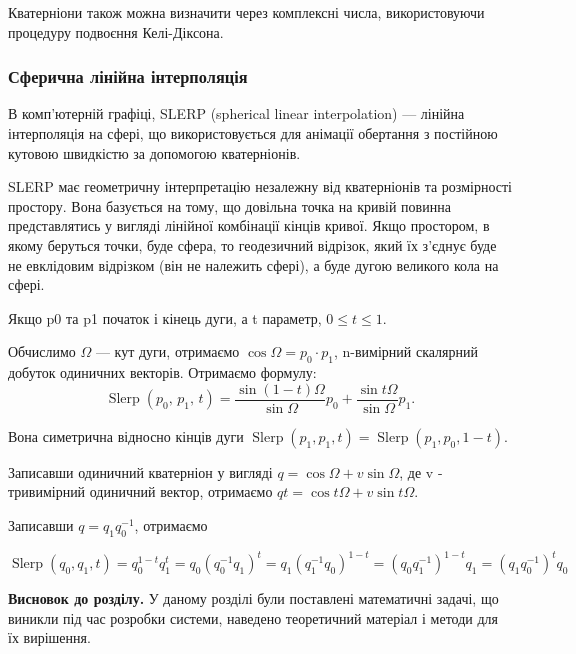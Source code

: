 Кватерніони також можна визначити через комплексні числа, використовуючи процедуру подвоєння Келі-Діксона.

\subsubsection{Сферична лінійна інтерполяція}

В комп'ютерній графіці, SLERP (spherical linear interpolation) — лінійна інтерполяція на сфері, що використовується для анімації обертання з постійною кутовою швидкістю за допомогою кватерніонів.

SLERP має геометричну інтерпретацію незалежну від кватерніонів та розмірності простору. Вона базується на тому, що довільна точка на кривій повинна представлятись у вигляді лінійної комбінації кінців кривої. Якщо простором, в якому беруться точки, буде сфера, то геодезичний відрізок, який їх з'єднує буде не евклідовим відрізком (він не належить сфері), а буде дугою великого кола на сфері.

Якщо p0 та p1 початок і кінець дуги, а t параметр, $0 \le t \le 1$.

Обчислимо $\Omega$ — кут дуги, отримаємо $\cos{\Omega} = p_0 \cdot p_1$, n-вимірний скалярний добуток одиничних векторів. Отримаємо формулу:
\begin{equation}
  \operatorname{Slerp}(p_0, \, p_1, \, t) = \frac{\sin {(1-t)\Omega}}{\sin \Omega} p_0 + \frac{\sin t\Omega}{\sin \Omega} p_1.
\end{equation}

Вона симетрична відносно кінців дуги
$\operatorname{Slerp}(p_1,p_1,t) = \operatorname{Slerp}(p_1,p_0,1-t)$.

Записавши одиничний кватерніон у вигляді $q = \cos{\Omega} + v\sin{\Omega}$, де v - тривимірний одиничний вектор, отримаємо $qt = \cos{t\Omega} + v\sin{t\Omega}$.

Записавши $q = q_1q_0^{-1}$, отримаємо

\begin{equation}
  \operatorname{Slerp}(q_0, q_1, t) = q_0^{1-t} q_1^t
  =q_0 (q_0^{-1} q_1)^t
  =q_1 (q_1^{-1} q_0)^{1-t}
  =(q_0 q_1^{-1})^{1-t} q_1
  =(q_1 q_0^{-1})^t q_0
\end{equation}

\textbf{Висновок до розділу.} У даному розділі були поставлені математичні задачі, що виникли під час розробки системи, наведено теоретичний матеріал і методи для їх вирішення.